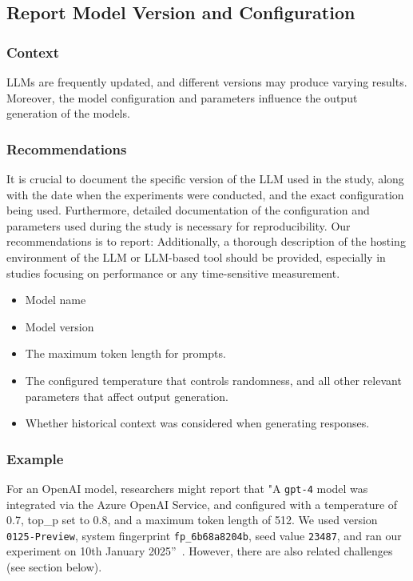 \documentclass[11pt]{article}
\begin{document}
\subsection{Report Model Version and Configuration}

\subsubsection{Context}

LLMs are frequently updated, and different versions may produce varying results.
Moreover, the model configuration and parameters influence the output generation of the models.

\subsubsection{Recommendations}

It is crucial to document the specific version of the LLM used in the study, along with the date when the experiments were conducted, and the exact configuration being used.
Furthermore, detailed documentation of the configuration and parameters used during the study is necessary for reproducibility. 
Our recommendations is to report:
Additionally, a thorough description of the hosting environment of the LLM or LLM-based tool should be provided, especially in studies focusing on performance or any time-sensitive measurement.

\begin{itemize}
\item Model name
\item Model version
\item The maximum token length for prompts.
\item The configured temperature that controls randomness, and all other relevant parameters that affect output generation.
\item Whether historical context was considered when generating responses.
\end{itemize}

\subsubsection{Example}

For an OpenAI model, researchers might report that "A  \texttt{gpt-4} model was integrated via the Azure OpenAI Service, and configured with a temperature of 0.7, top\_p set to 0.8, and a maximum token length of 512. We used version \texttt{0125-Preview}, system fingerprint \texttt{fp\_6b68a8204b}, seed value \texttt{23487}, and ran our experiment on 10th January 2025''~\cite{OpenAI25, Azure25}.
However, there are also related challenges (see section below).
\end{document}
